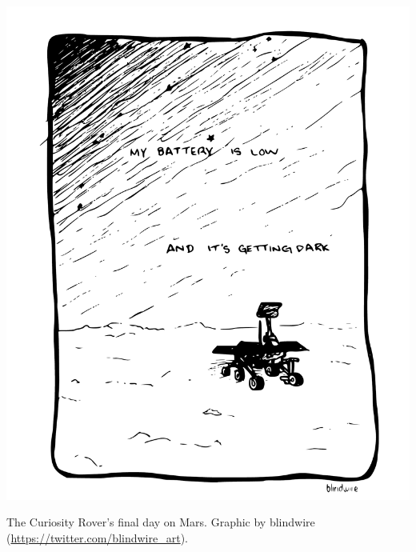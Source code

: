 \begin{center}
\includegraphics[width=\textwidth]{gfx/rover.pdf}
\end{center}
\footnotesize The Curiosity Rover's final day on Mars. Graphic by
blindwire (\url{https://twitter.com/blindwire_art}).
